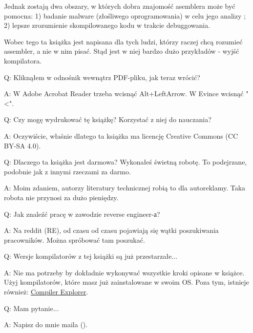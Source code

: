 Jednak zostają dwa obszary, w których dobra znajomość asemblera może być pomocna:
1) badanie malware (złośliwego oprogramowania) w celu jego analizy ; 2) lepsze zrozumienie skompilowanego kodu w trakcie debuggowania.

Wobec tego ta książka jest napisana dla tych ludzi, którzy raczej chcą rozumieć assembler, a nie w nim pisać. Stąd jest w niej bardzo dużo przykładów - wyjść kompilatora.

\par Q: Kliknąłem w odnośnik wewnątrz PDF-pliku, jak teraz wrócić?
\par A: W Adobe Acrobat Reader trzeba wcisnąć Alt+LeftArrow. W Evince wcisnąć "<".

\par Q: Czy mogę wydrukować tę książkę? Korzystać z niej do nauczania?
\par A: Oczywiście, właśnie dlatego ta książka ma licencję Creative Commons (CC BY-SA 4.0).

\par Q: Dlaczego ta książka jest darmowa? Wykonałeś świetną robotę. To podejrzane, podobnie jak z innymi rzeczami za darmo.
\par A: Moim zdaniem, autorzy literatury technicznej robią to dla autoreklamy. Taka robota nie przynosi za dużo pieniędzy.

\par Q: Jak znaleźć pracę w zawodzie reverse engineer-а?
\par A: Na reddit (RE\FNURLREDDIT), od czasu od czasu pojawiają się wątki poszukiwania pracowników.
Można spróbować tam poszukać.


\par Q: Wersje kompilatorów z tej książki są już przestarzałe...
\par A: Nie ma potrzeby by dokładnie wykonywać wszystkie kroki opisane w książce.
Użyj kompilatorów, które masz już zainstalowane w swoim \ac{OS}.
Poza tym, istnieje również: \href{https://godbolt.org/}{Compiler Explorer}.

\par Q: Mam pytanie...
\par A: Napisz do mnie maila (\EMAILS).

